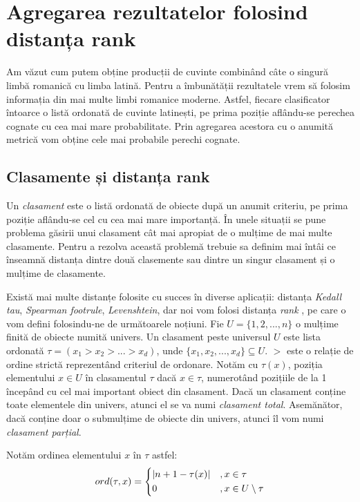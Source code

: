 \chapter{Agregarea rezultatelor folosind distanța rank}
Am văzut cum putem obține producții de cuvinte combinând câte o singură limbă romanică cu 
limba latină. Pentru a îmbunătății rezultatele vrem să folosim informația din mai multe 
limbi romanice moderne. Astfel, fiecare clasificator întoarce o listă ordonată de cuvinte latinești, 
pe prima poziție aflându-se perechea cognate cu cea mai mare probabilitate. Prin agregarea 
acestora cu o anumită metrică vom obține cele mai probabile perechi cognate.

\section{Clasamente și distanța rank}
Un \textit{clasament} este o listă ordonată de obiecte după un anumit criteriu, pe prima poziție 
aflându-se cel cu cea mai mare importanță. În unele situații se pune problema găsirii unui clasament
cât mai apropiat de o mulțime de mai multe clasamente. Pentru a rezolva această problemă trebuie sa
definim mai întâi ce înseamnă distanța dintre două clasemente sau dintre un singur clasament și o
mulțime de clasamente.

Există mai multe distanțe folosite cu succes în diverse aplicații: distanța \textit{Kedall tau}, 
\textit{Spearman footrule}, \textit{Levenshtein}, dar noi vom folosi distanța \textit{rank}
\cite{rankdistance}, pe care o vom defini folosindu-ne de următoarele noțiuni. Fie
$U = \{1, 2, ..., n\}$ 
o mulțime finită de obiecte numită univers. Un clasament peste universul $U$
este lista ordonată 
$\tau = (x_1 > x_2 > ... > x_d)$, unde 
$\{x_1, x_2, ..., x_d\} \subseteq U$.
$>$ este o relație de ordine strictă reprezentând criteriul de ordonare. Notăm cu $\tau(x)$, poziția
elementului $x \in U$ în clasamentul $\tau$ dacă $x \in \tau$, numerotând pozițiile de la 1 
începând cu cel mai important obiect din clasament. Dacă un clasament conține toate elementele din
univers, atunci el se va numi \textit{clasament total}. Asemănător, dacă conține doar o submulțime
de obiecte din univers, atunci îl vom numi \textit{clasament parțial}.

Notăm ordinea elementului $x$ în $\tau$ astfel:
\[
  ord(\tau, x)= \begin{dcases}
    |n + 1 - \tau(x)|    &, x \in \tau \\
    0                    &, x \in U \setminus \tau
  \end{dcases}
\]

